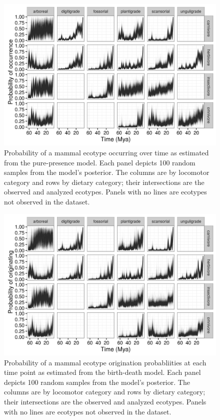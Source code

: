 \begin{figure}[ht]
  \centering
  \includegraphics[width=\textwidth,height=0.4\textheight,keepaspectratio=true]{chapter_coping/figure/ecotype_occurrence}
  \caption[Ecotype occurrence probability estimated from the pure-presence model]{Probability of a mammal ecotype occurring over time as estimated from the pure-presence model. Each panel depicts 100 random samples from the model's posterior. The columns are by locomotor category and rows by dietary category; their intersections are the observed and analyzed ecotypes. Panels with no lines are ecotypes not observed in the dataset.}
  \label{fig:eco_occur}
\end{figure}

\begin{figure}[ht]
  \centering
  \includegraphics[width=\textwidth,height=0.4\textheight,keepaspectratio=true]{chapter_coping/figure/ecotype_origin_bd}
  \caption[Ecotype origination probability estimated from the birth-death model]{Probability of a mammal ecotype origination probabliities at each time point as estimated from the birth-death model. Each panel depicts 100 random samples from the model's posterior. The columns are by locomotor category and rows by dietary category; their intersections are the observed and analyzed ecotypes. Panels with no lines are ecotypes not observed in the dataset.}
  \label{fig:eco_origin}
\end{figure}

